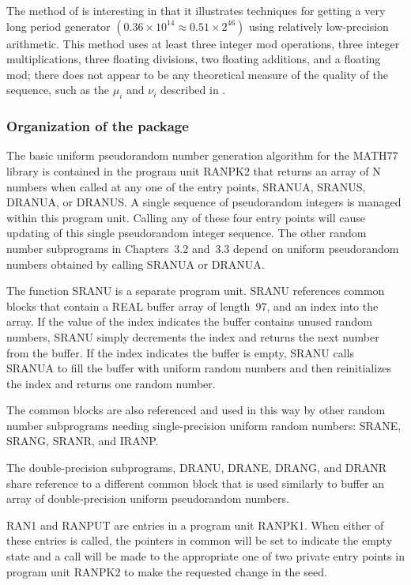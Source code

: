 \documentclass[twoside]{MATH77}
\begin{document}
The method of \cite{Wichmann:1982:AEP} is interesting in that it
illustrates techniques for getting a very long period generator
$(0.36\times 10^{14} \approx 0.51 \times 2^{46})$ using relatively
low-precision arithmetic.  This method uses at least three integer mod
operations, three integer multiplications, three floating divisions, two
floating additions, and a floating mod; there does not appear to be any
theoretical measure of the quality of the sequence, such as the $\mu _i$
and $\nu _i$ described in \cite{Knuth:1981:ACP}.

\subsubsection{Organization of the package}

The basic uniform pseudorandom number generation algorithm for the MATH77
library is contained in the program unit RANPK2 that returns an array of N
numbers when called at any one of the entry points, SRANUA, SRANUS, DRANUA,
or DRANUS. A single sequence of pseudorandom integers is managed within this
program unit. Calling any of these four entry points will cause updating of
this single pseudorandom integer sequence. The other random number
subprograms in Chapters~3.2 and~3.3 depend on uniform pseudorandom numbers
obtained by calling SRANUA or DRANUA.

The function SRANU is a separate program unit. SRANU references common
blocks that contain a REAL buffer array of length~97, and an index into the
array. If the value of the index indicates the buffer contains unused random
numbers, SRANU simply decrements the index and returns the next number from
the buffer. If the index indicates the buffer is empty, SRANU calls SRANUA
to fill the buffer with uniform random numbers and then reinitializes the
index and returns one random number.

The common blocks are also referenced and used in this way by other random
number subprograms needing single-precision uniform random numbers: SRANE,
SRANG, SRANR, and IRANP.

The double-precision subprograms, DRANU, DRANE, DRANG, and DRANR share
reference to a different common block that is used similarly to buffer an
array of double-precision uniform pseudorandom numbers.

RAN1 and RANPUT are entries in a program unit RANPK1. When either of these
entries is called, the pointers in common will be set to indicate the empty
state and a call will be made to the appropriate one of two private entry
points in program unit RANPK2 to make the requested change in the seed.
\end{document}
